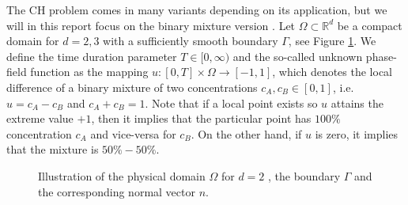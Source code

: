 \documentclass[11pt]{article}
\theoremstyle{remark}
\numberwithin{equation}{section}
\begin{document}
The CH problem comes in many variants depending on its application, but we will in this report focus on the binary mixture version \cite{miranville2017cahn}. Let $\Omega \subset  \mathbb{R} ^{d} $ be a compact domain for $d=2,3$ with a sufficiently smooth boundary
$\Gamma $,  see Figure \ref{fig:domain_construction}. We define the time duration parameter $T \in  [0,\infty) $ and the
so-called unknown phase-field function as the
mapping $u: \left[ 0, T \right] \times \Omega  \to \left[ -1,1 \right]  $, which denotes the local difference of a binary mixture of two concentrations $c_{A}, c_{B} \in \left[ 0,1\right] $, i.e. $u = c_{A} -c_{B}$ and $c_{A} + c_{B} = 1$. Note that
if a local point exists so $u$ attains the extreme value $+1$, then it implies that the particular point has $100\%$ concentration $c_{A}$ and vice-versa for $c_{B}$. On the other hand, if $u$ is zero, it implies that the mixture is $50\% - 50\%$.

\begin{figure}[htpb!]
    \centering
    \caption{Illustration of the physical domain $\Omega$ for $d=2$ , the boundary $\Gamma$ and the corresponding normal vector $n$.}
    \label{fig:domain_construction}
\end{figure}
\end{document}
